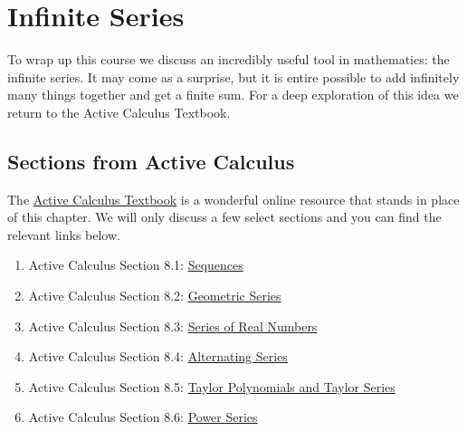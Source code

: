\chapter{Infinite Series}
To wrap up this course we discuss an incredibly useful tool in mathematics: the infinite
series.  It may come as a surprise, but it is entire possible to add infinitely many
things together and get a finite sum.  For a deep exploration of this idea we return to
the Active Calculus Textbook.

\section{Sections from Active Calculus}
The \href{http://faculty.gvsu.edu/boelkinm/Home/AC/index.html}{Active Calculus Textbook}
is a wonderful online resource that stands in place of this chapter.  We will only discuss a
few select sections and you can find the relevant links below.    

\begin{enumerate}
    \item Active Calculus Section 8.1:
        \href{https://activecalculus.org/single/sec-8-1-sequences.html}{Sequences}
    \item Active Calculus Section 8.2:
        \href{https://activecalculus.org/single/sec-8-2-geometric.html}{Geometric
        Series}
    \item Active Calculus Section 8.3:
        \href{https://activecalculus.org/single/sec-8-3-series.html}{Series of Real
        Numbers}
    \item Active Calculus Section 8.4:
        \href{https://activecalculus.org/single/sec-8-4-alternating.html}{Alternating
        Series}
    \item Active Calculus Section 8.5:
        \href{https://activecalculus.org/single/sec-8-5-taylor.html}{Taylor
        Polynomials and Taylor Series}
    \item Active Calculus Section 8.6:
        \href{https://activecalculus.org/single/sec-8-6-powerseries.html}{Power
        Series}
\end{enumerate}


